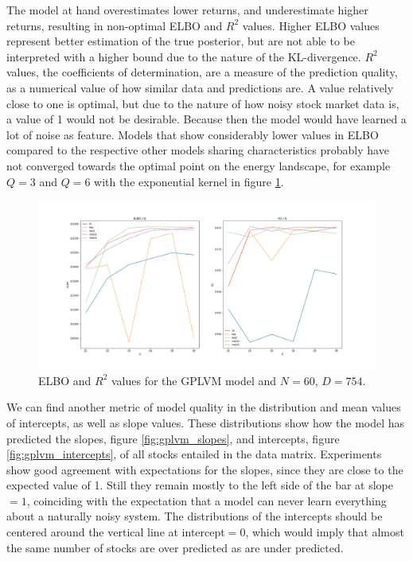The model at hand overestimates lower returns, and underestimate higher returns, resulting in non-optimal ELBO and $R^2$ values. Higher ELBO values represent better estimation of the true posterior, but are not able to be interpreted with a higher bound due to the nature of the KL-divergence. $R^2$ values, the coefficients of determination, are a measure of the prediction quality, as a numerical value of how similar data and predictions are. A value relatively close to one is optimal, but due to the nature of how noisy stock market data is, a value of 1 would not be desirable. Because then the model would have learned a lot of noise as feature. Models that show considerably lower values in ELBO compared to the respective other models sharing characteristics probably have not converged towards the optimal point on the energy landscape, for example $Q=3$ and $Q=6$ with the exponential kernel in figure \ref{fig:gplvm_ELBO_R2}. 
\begin{figure}
	\centering
	\includegraphics[width=7in]{img/07_0/modelGPLVM_Qs.png}
	\caption[ELBO and $R^2$ comparison for the GPLVM model]{ELBO and $R^2$ values for the GPLVM model and $N=60$, $D=754$. }
	\label{fig:gplvm_ELBO_R2}
\end{figure}
We can find another metric of model quality in the distribution and mean values of intercepts, as well as slope values. These distributions show how the model has predicted the slopes, figure \ref{fig:gplvm_slopes}, and intercepts, figure \ref{fig:gplvm_intercepts}, of all stocks entailed in the data matrix. Experiments show good agreement with expectations for the slopes, since they are close to the expected value of 1. Still they remain mostly to the left side of the bar at slope$=1$, coinciding with the expectation that a model can never learn everything about a naturally noisy system. The distributions of the intercepts should be centered around the vertical line at intercept$=0$, which would imply that almost the same number of stocks are over predicted as are under predicted.
